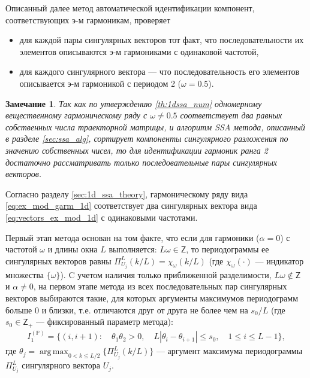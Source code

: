 \documentclass[specialist,
               substylefile = spbu.rtx,
               subf,href,colorlinks=true, 12pt]{disser}
\def\argmax{\mathop{\mathrm{argmax}}}
\def\argmax{\mathop{\mathrm{arg\,max}}}
\newtheorem{remark}{Замечание}
\begin{document}
Описанный далее метод автоматической идентификации компонент, соответствующих э-м гармоникам, проверяет
\begin{itemize}
\item для каждой пары сингулярных векторов тот факт, что последовательности их элементов описываются э-м гармониками с одинаковой частотой,
\item для каждого сингулярного вектора --- что последовательность его элементов описывается э-м гармоникой с периодом 2 ($\omega=0.5$).
\end{itemize}

\begin{remark}
Так как по утверждению \ref{th:1dssa_num} одномерному вещественному гармоническому ряду с $\omega \not = 0.5$ соответствует два равных собственных числа траекторной матрицы, и алгоритм SSA метода, описанный в разделе \ref{sec:ssa_alg}, сортирует компоненты сингулярного разложения по значению собственных чисел, то  
для идентификации гармоник ранга 2 достаточно рассматривать только последовательные пары сингулярных векторов.
\end{remark}

Согласно разделу \ref{sec:1d_ssa_theory}, гармоническому ряду вида \eqref{eq:ex_mod_garm_1d} соответствует два сингулярных вектора вида \eqref{eq:vectors_ex_mod_1d} с одинаковыми частотами.

Первый этап метода основан на том факте, что если для гармоники ($\alpha = 0$) с частотой $\omega$ и длины окна $L$ выполняется: $L \omega \in \mathsf{Z}$, то периодограммы ее сингулярных векторов равны $\Pi_{U_j}^L(k/L)=\chi_{\omega}(k/L)$ (где $\chi_{\omega}(\cdot)$ --- индикатор множества $\{\omega\}$).
C учетом наличия только приближенной разделимости, $L\omega \not \in \mathsf{Z}$ и $\alpha \not = 0$,   
на первом этапе метода из всех последовательных пар сингулярных векторов выбираются такие, для которых аргументы максимумов периодограмм больше 0 и близки, т.е. отличаются друг от друга не более чем на $s_0/L$ (где $s_0 \in \mathsf{Z}_+$ --- фиксированный параметр метода):
\begin{gather} \label{eq:I_1_P}
I_1^{(\mathbb{P})} = \{ (i, i+1): \quad \theta_1 \theta_2 >0, \quad L |\theta_i - \theta_{i+1}| \leqslant s_0, \quad 1 \leqslant i \leqslant L -1  \},
\end{gather}  
где $\theta_j = \argmax_{0 < k \leqslant L/2} \{\Pi_{U_j}^L(k/L)\}$ --- аргумент максимума периодограммы $\Pi_{U_j}^{L}$ сингулярного вектора $U_j$.
\end{document}
